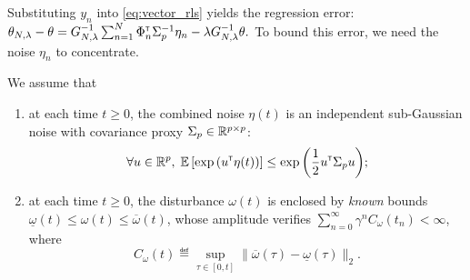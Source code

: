 \documentclass{article}
\begin{document}
Substituting $y_n$ into \eqref{eq:vector_rls} yields the regression error:
$
    \theta_{N,\lambda} - \theta = G_{N, \lambda}^{-1}\sum_{n=1}^N \Phi_n^{\mathsf{\scriptscriptstyle T}} \Sigma_p^{-1}\eta_n - \lambda G_{N, \lambda}^{-1}\theta.
$
To bound this error, we need the noise $\eta_n$ to concentrate.
%
%
%
%
%

\begin{assumption}
\label{assumpt:gaussian-noise}
We assume that
\begin{enumerate}
	\item at each time $t\geq0$, the combined noise $\eta(t)$ is an independent sub-Gaussian noise with covariance proxy $\Sigma_p \in \mathbb{R}^{p\times p}$:
	$$
	\forall u\in\mathbb{R}^p,\; \operatorname*{\mathbb{E}} \left[ \exp{\left( u^{\mathsf{\scriptscriptstyle T}}\eta(t)\right)}\right] \leq \exp{\left( \frac{1}{2} u^{\mathsf{\scriptscriptstyle T}}\Sigma_p u\right)};
	$$
	\item at each time $t\geq0$, the disturbance $\omega(t)$ is enclosed by \emph{known} bounds $\underline{\omega}(t) \leq \omega(t) \leq \overline{\omega}(t)$, whose amplitude verifies $\sum_{n=0}^\infty \gamma^n C_\omega(t_n) < \infty$, where $$C_\omega(t) \eqdef \sup_{\tau\in[0,t]} \|\overline{\omega}(\tau) - \underline{\omega}(\tau)\|_2.$$
\end{enumerate}



\end{assumption}
\end{document}
